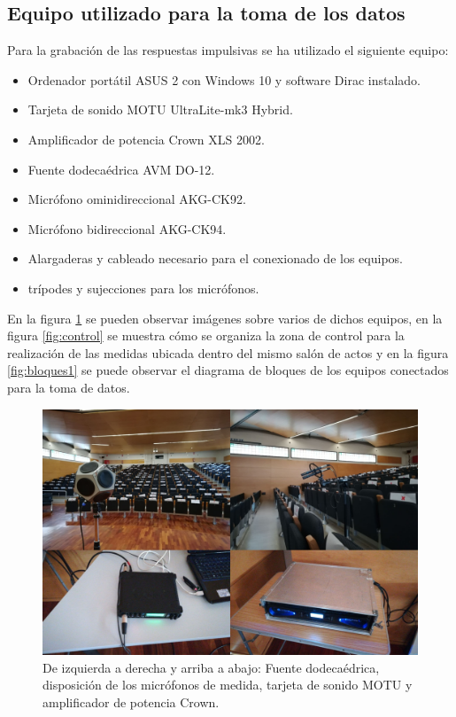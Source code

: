 \documentclass[11pt,a4paper,twoside]{book}
\begin{document}
	    \subsection{Equipo utilizado para la toma de los datos}
	        Para la grabación de las respuestas impulsivas se ha utilizado el siguiente equipo:
	        \begin{itemize}
	            \item Ordenador portátil ASUS 2 con Windows 10 y software Dirac instalado.
	            \item Tarjeta de sonido MOTU UltraLite-mk3 Hybrid.
	            \item Amplificador de potencia Crown XLS 2002.
	            \item Fuente dodecaédrica AVM DO-12.
	            \item Micrófono ominidireccional AKG-CK92.
	            \item Micrófono bidireccional AKG-CK94.
	            \item Alargaderas y cableado necesario para el conexionado de los equipos.
	            \item trípodes y sujecciones para los micrófonos.
	        
	        \end{itemize}
	    
	        En la figura \ref{fig:equipos} se pueden observar imágenes sobre varios de dichos equipos, en la figura \ref{fig:control} se muestra cómo se organiza la zona de control para la realización de las medidas ubicada dentro del mismo salón de actos y en la figura \ref{fig:bloques1} se puede observar el diagrama de bloques de los equipos conectados para la toma de datos.
	    
	        \begin{figure}[H]
	            \includegraphics[scale=0.6]{../imagenes/equipos.jpg}
			    \centering
			    \caption{De izquierda a derecha y arriba a abajo: Fuente dodecaédrica, disposición de los micrófonos de medida, tarjeta de sonido MOTU y amplificador de potencia Crown.}
			    \label{fig:equipos}
	        \end{figure}
	    
\end{document}
